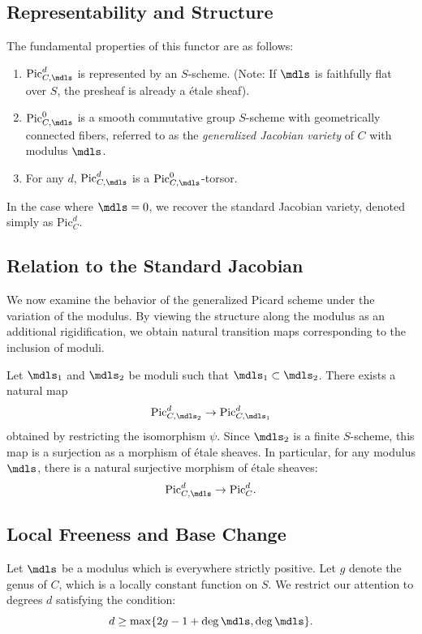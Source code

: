 \subsection*{Representability and Structure}
The fundamental properties of this functor are as follows:
\begin{enumerate}
    \item $\text{Pic}_{C, \mdls}^{d}$ is represented by an $S$-scheme. (Note: If $\mdls$ is faithfully flat over $S$, the presheaf is already a \'etale sheaf).
    \item $\text{Pic}_{C, \mdls}^{0}$ is a smooth commutative group $S$-scheme with geometrically connected fibers, referred to as the \textit{generalized Jacobian variety} of $C$ with modulus $\mdls$.
    \item For any $d$, $\text{Pic}_{C, \mdls}^{d}$ is a $\text{Pic}_{C, \mdls}^{0}$-torsor.
\end{enumerate}
In the case where $\mdls = 0$, we recover the standard Jacobian variety, denoted simply as $\text{Pic}_C^d$.
\subsection*{Relation to the Standard Jacobian}
We now examine the behavior of the generalized Picard scheme under the variation of the modulus. By viewing the structure along the modulus as an additional rigidification, we obtain natural transition maps corresponding to the inclusion of moduli.

Let $\mdls_1$ and $\mdls_2$ be moduli such that $\mdls_1 \subset \mdls_2$. There exists a natural map 
\[
\text{Pic}_{C, \mdls_2}^d \to \text{Pic}_{C, \mdls_1}^d
\]
obtained by restricting the isomorphism $\psi$. Since $\mdls_2$ is a finite $S$-scheme, this map is a surjection as a morphism of \'etale sheaves.
In particular, for any modulus $\mdls$, there is a natural surjective morphism of \'etale sheaves:
\[
\text{Pic}_{C, \mdls}^d \to \text{Pic}_C^d.
\]


\subsection*{Local Freeness and Base Change}
Let $\mdls$ be a modulus which is everywhere strictly positive. Let $g$ denote the genus of $C$, which is a locally constant function on $S$. We restrict our attention to degrees $d$ satisfying the condition:
\begin{equation} \label{equation:degree-condition}
    d \geq \max\{2g - 1 + \deg \mdls, \deg \mdls\}.
\end{equation}

